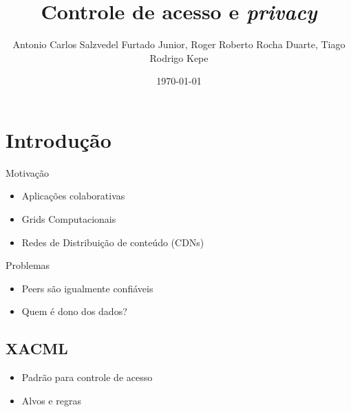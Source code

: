 \documentclass{beamer}
\title[Trabalho de Gerenciamento de Dados Distribuídos - CI303]{Controle de acesso e \textit{privacy}}
\author[Antonio Carlos, Roger e Tiago.]{Antonio Carlos Salzvedel Furtado Junior, Roger Roberto Rocha Duarte, Tiago Rodrigo Kepe}
\institute{Universidade Federal do Paraná - UFPR}
\date{\today}
\begin{document}
\begin{frame}
\titlepage
\end{frame}


\section{Introdução}


\begin{frame}{Motivação}

	\begin{itemize}
	 \item Aplicações colaborativas
	 \item Grids Computacionais
	 \item Redes de Distribuição de conteúdo (CDNs)
	\end{itemize}
\end{frame}

\begin{frame}{Problemas}

	\begin{itemize}
	 \item Peers são igualmente confiáveis
	 \item Quem é dono dos dados?
	\end{itemize}
\end{frame}


%
\subsection{XACML}
\begin{frame}
 \begin{itemize}
  \item Padrão para controle de acesso
  \item Alvos e regras
 \end{itemize}

\end{frame}
\end{document}
